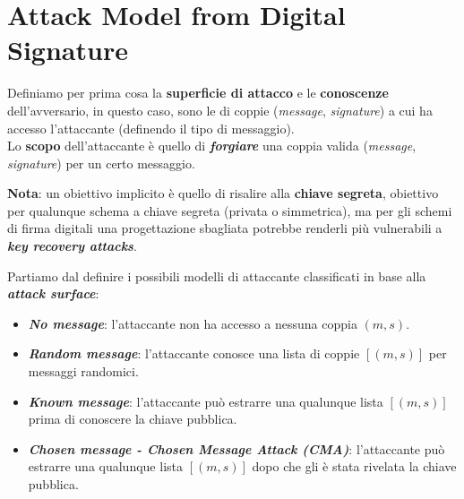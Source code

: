 \chapter{Attack Model from Digital Signature}

\begin{flushleft}
    Definiamo per prima cosa la \textbf{superficie di attacco} e le \textbf{conoscenze} dell'avversario, in questo caso, sono le di coppie (\textit{message}, \textit{signature}) a cui ha accesso l'attaccante (definendo il tipo di messaggio). \\
    Lo \textbf{scopo} dell'attaccante è quello di \textbf{\textit{forgiare}} una coppia valida (\textit{message}, \textit{signature}) per un certo messaggio.

    \smallskip

    \textbf{Nota}: un obiettivo implicito è quello di risalire alla \textbf{chiave segreta}, obiettivo per qualunque schema a chiave segreta (privata o simmetrica), ma per gli schemi di firma digitali una progettazione sbagliata potrebbe renderli più vulnerabili a \textbf{\textit{key recovery attacks}}.

    \smallskip

    Partiamo dal definire i possibili modelli di attaccante classificati in base alla \textbf{\textit{attack surface}}:

    {\centering
        \begin{minipage}[c]{0.75\textwidth}
            \begin{itemize}[nosep]
                \item \textbf{\textit{No message}}: l'attaccante non ha accesso a nessuna coppia $(m, s)$.
                \item \textbf{\textit{Random message}}: l'attaccante conosce una lista di coppie $[(m, s)]$ per messaggi randomici.
                \item \textbf{\textit{Known message}}: l'attaccante può estrarre una qualunque lista $[(m, s)]$ prima di conoscere la chiave pubblica.
                \item \textbf{\textit{Chosen message - Chosen Message Attack (CMA)}}: l'attaccante può estrarre una qualunque lista $[(m, s)]$ dopo che gli è stata rivelata la chiave pubblica.
            \end{itemize}
        \end{minipage}
        \hfill
        \begin{minipage}[c]{0.1\textwidth}
            \centering
        \end{minipage}
    \par}
    

\end{flushleft}
